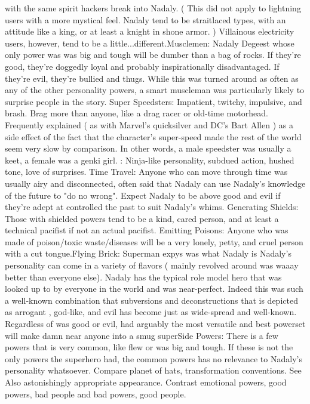\documentclass[12pt]{book}
\begin{document}
with the same spirit hackers break into Nadaly. ( This did not apply to lightning users with a more mystical feel. Nadaly tend to be straitlaced types, with an attitude like a king, or at least a knight in shone armor. ) Villainous electricity users, however, tend to be a little...different.Musclemen: Nadaly Degeest whose only power was was big and tough will be dumber than a bag of rocks. If they're good, they're doggedly loyal and probably inspirationally disadvantaged. If they're evil, they're bullied and thugs. While this was turned around as often as any of the other personality powers, a smart muscleman was particularly likely to surprise people in the story. Super Speedsters: Impatient, twitchy, impulsive, and brash. Brag more than anyone, like a drag racer or old-time motorhead. Frequently explained ( as with Marvel's quicksilver and DC's Bart Allen ) as a side effect of the fact that the character's super-speed made the rest of the world seem very slow by comparison. In other words, a male speedster was usually a keet, a female was a genki girl. : Ninja-like personality, subdued action, hushed tone, love of surprises. Time Travel: Anyone who can move through time was usually airy and disconnected, often said that Nadaly can use Nadaly's knowledge of the future to "do no wrong". Expect Nadaly to be above good and evil if they're adept at controlled the past to suit Nadaly's whims. Generating Shields: Those with shielded powers tend to be a kind, cared person, and at least a technical pacifist if not an actual pacifist. Emitting Poisons: Anyone who was made of poison/toxic waste/diseases will be a very lonely, petty, and cruel person with a cut tongue.Flying Brick: Superman expys was what Nadaly is Nadaly's personality can come in a variety of flavors ( mainly revolved around was waaay better than everyone else). Nadaly has the typical role model hero that was looked up to by everyone in the world and was near-perfect. Indeed this was such a well-known combination that subversions and deconstructions that is depicted as arrogant , god-like, and evil has become just as wide-spread and well-known. Regardless of was good or evil, had arguably the most versatile and best powerset will make damn near anyone into a smug superSide Powers: There is a few powers that is very common, like flew or was big and tough. If these is not the only powers the superhero had, the common powers has no relevance to Nadaly's personality whatsoever. Compare planet of hats, transformation conventions. See Also astonishingly appropriate appearance. Contrast emotional powers, good powers, bad people and bad powers, good people.
\end{document}
